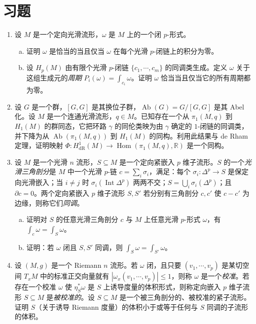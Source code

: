 \documentclass[../../main.tex]{subfiles}
\begin{document}
\section{习题}\label{section:ch18-problems}

\begin{enumerate}
\item\label{exercise:ch18-02} 设 $M$ 是一个定向光滑流形，$\omega$ 是 $M$ 上的一个闭 $p$-形式。
\begin{enumerate}[(a)]
\item 证明 $\omega$ 是恰当的当且仅当 $\omega$ 在每个光滑 $p$-闭链上的积分为零。
\item 设 $H_p(M)$ 由有限个光滑 $p$-闭链 $\{c_1,\cdots ,c_m\}$ 的同调类生成。定义 $\omega$ 关于这组生成元的\emph{周期} $P_i(\omega)=\int_{c_i}\omega$。证明 $\omega$ 恰当当且仅当它的所有周期都为零。
\end{enumerate}

\item\label{exercise:ch18-03} 设 $G$ 是一个群，$[G,G]$ 是其换位子群，$\operatorname{Ab}(G)=G/[G,G]$ 是其 Abel 化。设 $M$ 是一个连通光滑流形，$q\in M$。已知存在一个从 $\pi_1(M,q)$ 到 $H_1(M)$ 的群同态，它把环路 $\gamma$ 的同伦类映为由 $\gamma$ 确定的 $1$-闭链的同调类，并下降为从 $\operatorname{Ab}(\pi_1(M,q))$ 到 $H_1(M)$ 的同构。利用此结果与 de Rham 定理，证明映射 $\Phi:H^1_{\mathrm{dR}}(M)\to\operatorname{Hom}(\pi_1(M,q),\mathbb{R})$ 是一个同构。

\item\label{exercise:ch18-04} 设 $M$ 是一个光滑 $n$ 流形，$S\subseteq M$ 是一个定向紧嵌入 $p$ 维子流形。$S$ 的一个\emph{光滑三角剖分}是 $M$ 中一个光滑 $p$-链 $c=\sum_i\sigma_i$，满足：每个 $\sigma_i:\Delta^p\to S$ 是保定向光滑嵌入；当 $i\neq j$ 时 $\sigma_i(\operatorname{Int}\Delta^p)$ 两两不交；$S=\bigcup_i\sigma_i(\Delta^p)$；且 $\partial c=0$。两个定向紧嵌入 $p$ 维子流形 $S,S'$ 若分别有三角剖分 $c,c'$ 使 $c-c'$ 为边缘，则称它们\emph{同调}。
\begin{enumerate}[(a)]
\item 证明对 $S$ 的任意光滑三角剖分 $c$ 与 $M$ 上任意光滑 $p$-形式 $\omega$，有 $\int_c\omega=\int_S\omega$。
\item 证明：若 $\omega$ 闭且 $S,S'$ 同调，则 $\int_S\omega=\int_{S'}\omega$。
\end{enumerate}

\item\label{exercise:ch18-05} 设 $(M,g)$ 是一个 Riemann $n$ 流形。若 $\omega$ 闭，且只要 $(v_1,\cdots ,v_p)$ 是某切空间 $T_xM$ 中的标准正交向量就有 $|\omega_x(v_1,\cdots ,v_p)|\leqslant1$，则称 $\omega$ 是一个\emph{校准}。若存在一个校准 $\omega$ 使 $\eta_S^*\omega$ 是 $S$ 上诱导度量的体积形式，则称定向嵌入 $p$ 维子流形 $S\subseteq M$ 是\emph{被校准的}。设 $S\subseteq M$ 是一个被三角剖分的、被校准的紧子流形。证明 $S$（关于诱导 Riemann 度量）的体积小于或等于任何与 $S$ 同调的子流形的体积。


\end{enumerate}
\end{document}
